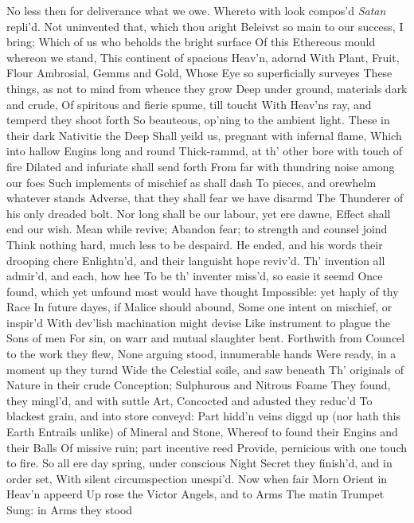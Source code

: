 \documentclass[11pt]{book}
\begin{document}
No less then for deliverance what we owe. 
\quad Whereto with look compos'd \textit{Satan} repli'd. 
Not uninvented that, which thou aright 
Beleivst so main to our success, I bring; 
Which of us who beholds the bright surface 
Of this Ethereous mould whereon we stand, 
This continent of spacious Heav'n, adornd 
With Plant, Fruit, Flour Ambrosial, Gemms and Gold, 
Whose Eye so superficially surveyes 
These things, as not to mind from whence they grow 
Deep under ground, materials dark and crude, 
Of spiritous and fierie spume, till toucht 
With Heav'ns ray, and temperd they shoot forth 
So beauteous, op'ning to the ambient light. 
These in their dark Nativitie the Deep 
Shall yeild us, pregnant with infernal flame, 
Which into hallow Engins long and round 
Thick-rammd, at th' other bore with touch of fire 
Dilated and infuriate shall send forth 
From far with thundring noise among our foes 
Such implements of mischief as shall dash 
To pieces, and orewhelm whatever stands 
Adverse, that they shall fear we have disarmd 
The Thunderer of his only dreaded bolt. 
Nor long shall be our labour, yet ere dawne, 
Effect shall end our wish.  Mean while revive; 
Abandon fear; to strength and counsel joind 
Think nothing hard, much less to be despaird. 
He ended, and his words their drooping chere 
Enlightn'd, and their languisht hope reviv'd. 
Th' invention all admir'd, and each, how hee 
To be th' inventer miss'd, so easie it seemd 
Once found, which yet unfound most would have thought 
Impossible: yet haply of thy Race 
In future dayes, if Malice should abound, 
Some one intent on mischief, or inspir'd 
With dev'lish machination might devise 
Like instrument to plague the Sons of men 
For sin, on warr and mutual slaughter bent. 
Forthwith from Councel to the work they flew, 
None arguing stood, innumerable hands 
Were ready, in a moment up they turnd 
Wide the Celestial soile, and saw beneath 
Th' originals of Nature in their crude 
Conception; Sulphurous and Nitrous Foame 
They found, they mingl'd, and with suttle Art, 
Concocted and adusted they reduc'd 
To blackest grain, and into store conveyd: 
Part hidd'n veins diggd up (nor hath this Earth 
Entrails unlike) of Mineral and Stone, 
Whereof to found their Engins and their Balls 
Of missive ruin; part incentive reed 
Provide, pernicious with one touch to fire. 
So all ere day spring, under conscious Night 
Secret they finish'd, and in order set, 
With silent circumspection unespi'd. 
Now when fair Morn Orient in Heav'n appeerd 
Up rose the Victor Angels, and to Arms 
The matin Trumpet Sung: in Arms they stood 
\end{document}
